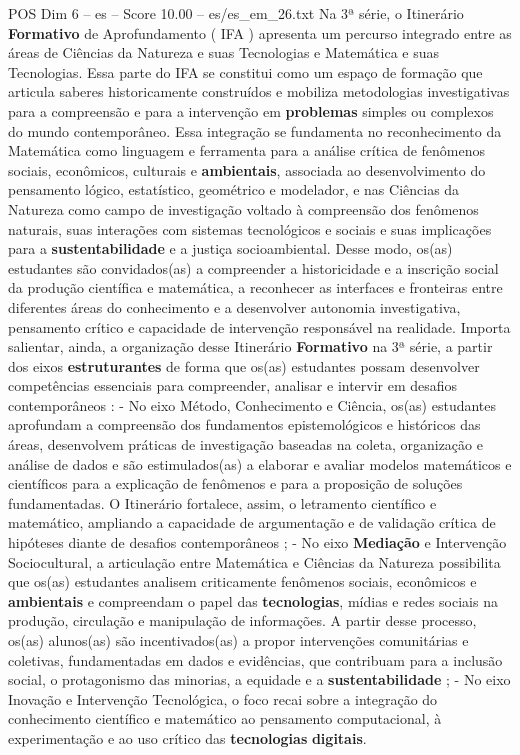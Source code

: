 \begin{textsample}{POS Dim 6 – es – Score 10.00 – es/es\_em\_26.txt}
Na 3ª série, o Itinerário \textbf{Formativo} de Aprofundamento ( IFA ) apresenta um percurso integrado entre as áreas de Ciências da Natureza e suas Tecnologias e Matemática e suas Tecnologias.
Essa parte do IFA se constitui como um espaço de formação que articula saberes historicamente construídos e mobiliza metodologias investigativas para a compreensão e para a intervenção em \textbf{problemas} simples ou complexos do mundo contemporâneo.
Essa integração se fundamenta no reconhecimento da Matemática como linguagem e ferramenta para a análise crítica de fenômenos sociais, econômicos, culturais e \textbf{ambientais}, associada ao desenvolvimento do pensamento lógico, estatístico, geométrico e modelador, e nas Ciências da Natureza como campo de investigação voltado à compreensão dos fenômenos naturais, suas interações com sistemas tecnológicos e sociais e suas implicações para a \textbf{sustentabilidade} e a justiça socioambiental.
Desse modo, os(as) estudantes são convidados(as) a compreender a historicidade e a inscrição social da produção científica e matemática, a reconhecer as interfaces e fronteiras entre diferentes áreas do conhecimento e a desenvolver autonomia investigativa, pensamento crítico e capacidade de intervenção responsável na realidade.
Importa salientar, ainda, a organização desse Itinerário \textbf{Formativo} na 3ª série, a partir dos eixos \textbf{estruturantes} de forma que os(as) estudantes possam desenvolver competências essenciais para compreender, analisar e intervir em desafios contemporâneos : - No eixo Método, Conhecimento e Ciência, os(as) estudantes aprofundam a compreensão dos fundamentos epistemológicos e históricos das áreas, desenvolvem práticas de investigação baseadas na coleta, organização e análise de dados e são estimulados(as) a elaborar e avaliar modelos matemáticos e científicos para a explicação de fenômenos e para a proposição de soluções fundamentadas.
O Itinerário fortalece, assim, o letramento científico e matemático, ampliando a capacidade de argumentação e de validação crítica de hipóteses diante de desafios contemporâneos ; - No eixo \textbf{Mediação} e Intervenção Sociocultural, a articulação entre Matemática e Ciências da Natureza possibilita que os(as) estudantes analisem criticamente fenômenos sociais, econômicos e \textbf{ambientais} e compreendam o papel das \textbf{tecnologias}, mídias e redes sociais na produção, circulação e manipulação de informações.
A partir desse processo, os(as) alunos(as) são incentivados(as) a propor intervenções comunitárias e coletivas, fundamentadas em dados e evidências, que contribuam para a inclusão social, o protagonismo das minorias, a equidade e a \textbf{sustentabilidade} ; - No eixo Inovação e Intervenção Tecnológica, o foco recai sobre a integração do conhecimento científico e matemático ao pensamento computacional, à experimentação e ao uso crítico das \textbf{tecnologias} \textbf{digitais}.

\end{textsample}
